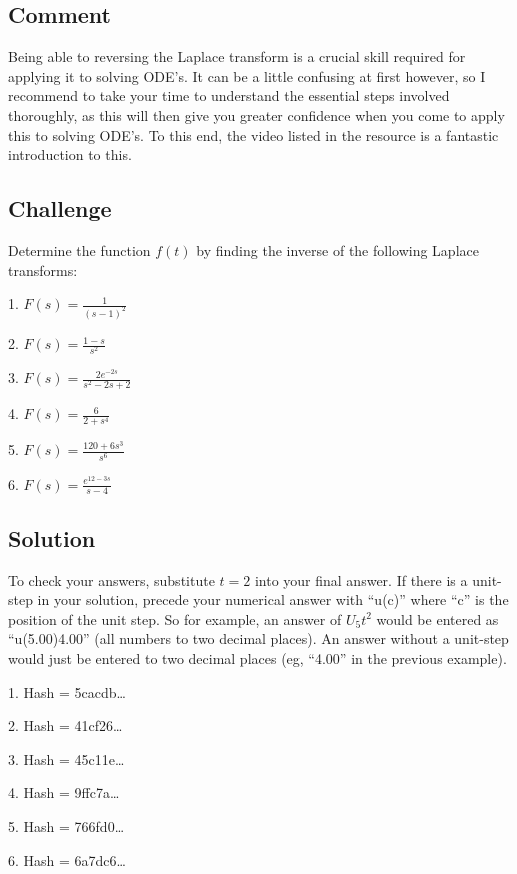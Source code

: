 \subsection*{Comment}
Being able to reversing the Laplace transform is a crucial skill required for applying it to solving ODE's. It can be a little confusing at first however, so I recommend to take your time to understand the essential steps involved thoroughly, as this will then give you greater confidence when you come to apply this to solving ODE's. To this end, the video listed in the resource is a fantastic introduction to this.

\subsection*{Challenge}
Determine the function $f(t)$ by finding the inverse of the following Laplace transforms:

1. $\displaystyle F(s)=\frac{1}{(s-1)^2}$

2. $\displaystyle F(s)=\frac{1-s}{s^2}$

3. $\displaystyle F(s)=\frac{2 e^{-2s}}{s^2-2s+2}$

4. $\displaystyle F(s)=\frac{6}{2+s^4}$

5. $\displaystyle F(s)=\frac{120+6s^3}{s^6}$

6. $\displaystyle F(s)=\frac{e^{12-3s}}{s-4}$


\subsection*{Solution}
To check your answers, substitute $t=2$ into your final answer. If there is a unit-step in your solution, precede your numerical answer with ``u(c)'' where ``c'' is the position of the unit step. So for example, an answer of $U_5 t^2$ would be entered as ``u(5.00)4.00'' (all numbers to two decimal places). An answer without a unit-step would just be entered to two decimal places (eg, ``4.00'' in the previous example).

1. Hash = 5cacdb\ldots

2. Hash = 41cf26\ldots

3. Hash = 45c11e\ldots

4. Hash = 9ffc7a\ldots

5. Hash = 766fd0\ldots

6. Hash = 6a7dc6\ldots




\newpage
